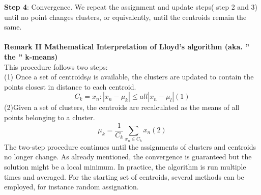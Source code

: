 \documentclass[a4paper,12pt,fleqn]{article}
\begin{document}
\textbf{Step 4}: Convergence. We repeat the assignment and update steps( step 2 and 3) until no point changes clusters, or equivalently, until the centroids remain the same. \\
\\
\textbf{Remark II Mathematical Interpretation of Lloyd's algorithm (aka. '' the '' k-means)}\\
This procedure follows two steps:\\
(1) Once a set of centroids$ \mu$ is available, the clusters are updated to contain the points closest in distance to each centroid. \\
\begin{equation*}
C_k={x_n:|x_n - \mu_k|\le all |x_n - \mu_l|}                 (1)
\end{equation*}
(2)Given a set of clusters, the centroids are recalculated as the means of all points belonging to a cluster.
\begin{equation*}
\mu_k=\frac{1}{C_k}\sum_{x_n \in C_k}x_n                 (2)
\end{equation*}
The two-step procedure continues until the assignments of clusters and centroids no longer change. As already mentioned, the convergence is guaranteed but the solution might be a local minimum. In practice, the algorithm is run multiple times and averaged. For the starting set of centroids, several methods can be employed, for instance random assignation.\\
\end{document}
